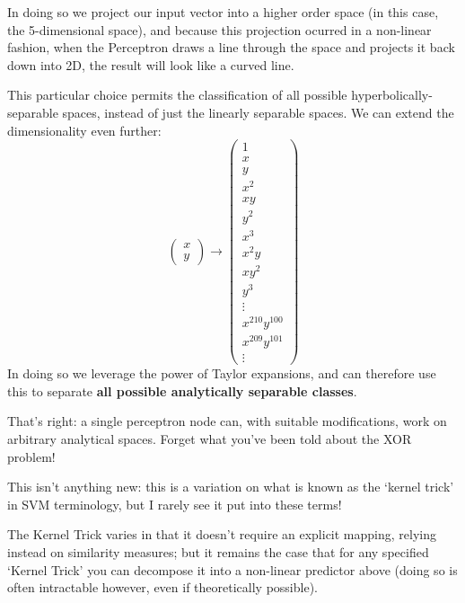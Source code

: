 \documentclass[a4paper,openany,11pt]{book}
\begin{document}
				In doing so we project our input vector into a higher order space (in this case, the 5-dimensional space), and because this projection ocurred in a non-linear fashion, when the Perceptron draws a line through the space and projects it back down into 2D, the result will look like a curved line. 

				This particular choice permits the classification of all possible hyperbolically-separable spaces, instead of just the linearly separable spaces. We can extend the dimensionality even further:
				\begin{equation}
					\begin{pmatrix}
						x \\ y
					\end{pmatrix} \to \begin{pmatrix}
						1 \\ x \\ y \\ x^2 \\ xy \\ y^2 \\ x^3 \\ x^2 y \\ x y^2 \\ y^3 \\ \vdots \\x^{210} y^{100} \\ x^{209} y^{101} \\ \vdots
					\end{pmatrix}
				\end{equation}
				In doing so we leverage the power of Taylor expansions, and can therefore use this to separate \textbf{all possible analytically separable classes}.

				That's right: a single perceptron node can, with suitable modifications, work on arbitrary analytical spaces. Forget what you've been told about the XOR problem!

				\begin{aside}
					This isn't anything new: this is a variation on what is known as the `kernel trick' in SVM terminology, but I rarely see it put into these terms!

					The Kernel Trick varies in that it doesn't require an explicit mapping, relying instead on similarity measures; but it remains the case that for any specified `Kernel Trick' you can decompose it into a non-linear predictor above (doing so is often intractable however, even if theoretically possible).
				\end{aside}
\end{document}
